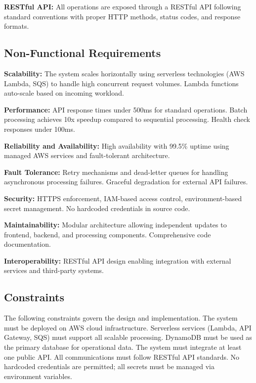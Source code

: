 \documentclass[conference]{IEEEtran}
\begin{document}
\textbf{RESTful API:} All operations are exposed through a RESTful API following standard conventions with proper HTTP methods, status codes, and response formats.

\subsection{Non-Functional Requirements}

\textbf{Scalability:} The system scales horizontally using serverless technologies (AWS Lambda, SQS) to handle high concurrent request volumes. Lambda functions auto-scale based on incoming workload.

\textbf{Performance:} API response times under 500ms for standard operations. Batch processing achieves 10x speedup compared to sequential processing. Health check responses under 100ms.

\textbf{Reliability and Availability:} High availability with 99.5\% uptime using managed AWS services and fault-tolerant architecture.

\textbf{Fault Tolerance:} Retry mechanisms and dead-letter queues for handling asynchronous processing failures. Graceful degradation for external API failures.

\textbf{Security:} HTTPS enforcement, IAM-based access control, environment-based secret management. No hardcoded credentials in source code.

\textbf{Maintainability:} Modular architecture allowing independent updates to frontend, backend, and processing components. Comprehensive code documentation.

\textbf{Interoperability:} RESTful API design enabling integration with external services and third-party systems.

\subsection{Constraints}

The following constraints govern the design and implementation. The system must be deployed on AWS cloud infrastructure. Serverless services (Lambda, API Gateway, SQS) must support all scalable processing. DynamoDB must be used as the primary database for operational data. The system must integrate at least one public API. All communications must follow RESTful API standards. No hardcoded credentials are permitted; all secrets must be managed via environment variables.

\end{document}
